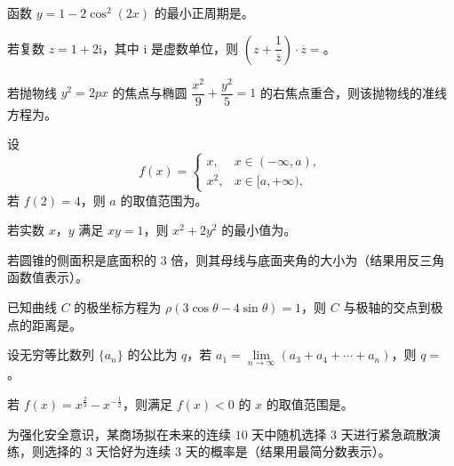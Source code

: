 \begin{question}
函数 $y=1-2\cos^2(2x)$ 的最小正周期是\gkblank{}。

\end{question}
\begin{question}
若复数 $z=1+2\mathrm i$，其中 $\mathrm i$ 是虚数单位，则 $\left(z+\dfrac1{\overline z}\right)\cdot\overline z=$\gkblank{}。

\end{question}
\begin{question}
若抛物线 $y^2=2px$ 的焦点与椭圆 $\dfrac{x^2}{9}+\dfrac{y^2}{5}=1$ 的右焦点重合，则该抛物线的准线方程为\gkblank{}。

\end{question}
\begin{question}
设
\nopagebreak[4]
\[f(x)=\begin{cases}
x, & x\in(-\infty,a),\\
x^2, & x\in[a,+\infty),
\end{cases}\]
若 $f(2)=4$，则 $a$ 的取值范围为\gkblank{}。

\end{question}
\begin{question}
若实数 $x$，$y$ 满足 $xy=1$，则 $x^2+2y^2$ 的最小值为\gkblank{}。

\end{question}
\begin{question}
若圆锥的侧面积是底面积的 $3$ 倍，则其母线与底面夹角的大小为\gkblank{}（结果用反三角函数值表示）。

\end{question}
\begin{question}
已知曲线 $C$ 的极坐标方程为 $\rho(3\cos\theta-4\sin\theta)=1$，则 $C$ 与极轴的交点到极点的距离是\gkblank{}。

\end{question}
\begin{question}
设无穷等比数列 $\{a_n\}$ 的公比为 $q$，若 $a_1=\lim\limits_{n\to\infty}(a_3+a_4+\cdots+a_n)$，则 $q=$\gkblank{}。

\end{question}
\begin{question}
若 $f(x)=x^{\frac23}-x^{-\frac12}$，则满足 $f(x)<0$ 的 $x$ 的取值范围是\gkblank{}。

\end{question}
\begin{question}
为强化安全意识，某商场拟在未来的连续 $10$ 天中随机选择 $3$ 天进行紧急疏散演练，则选择的 $3$ 天恰好为连续 $3$ 天的概率是\gkblank{}（结果用最简分数表示）。

\end{question}
